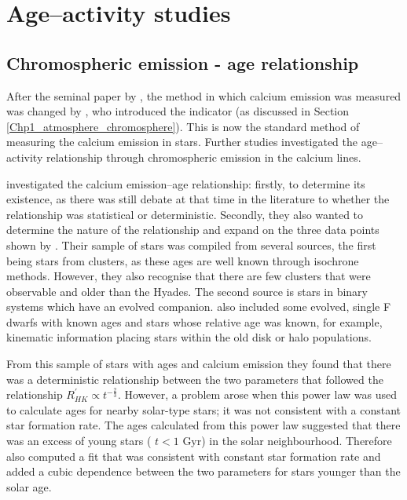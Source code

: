 \section{Age--activity studies}
\label{Chp2_section_activity_age}
\subsection{Chromospheric emission - age relationship}

After the seminal paper by \citet{Skumanich_1972}, the method in which calcium emission was measured was changed by \citet{Noyes_etal_1984}, who introduced the \Rprime indicator (as discussed in Section \ref{Chp1_atmosphere_chromosphere}). This is now the standard method of measuring the calcium emission in stars. Further studies investigated the age--activity relationship through chromospheric emission in the calcium lines.

\citet{Soderblom_etal_1991} investigated the calcium emission--age relationship: firstly, to determine its existence, as there was still debate at that time in the literature to whether the relationship was statistical or deterministic. Secondly, they also wanted to determine the nature of the relationship and expand on the three data points shown by \citet{Skumanich_1972}. Their sample of stars was compiled from several sources, the first being stars from clusters, as these ages are well known through isochrone methods. However, they also recognise that there are few clusters that were observable and older than the Hyades. The second source is stars in binary systems which have an evolved companion. \citet{Soderblom_etal_1991} also included some evolved, single F dwarfs with known ages and stars whose relative age was known, for example, kinematic information placing stars within the old disk or halo populations.

From this sample of stars with ages and calcium emission they found that there was a deterministic relationship between the two parameters that followed the relationship $R^{'}_{HK} \propto t^{-\frac{2}{3}}$. However, a problem arose when this power law was used to calculate ages for nearby solar-type stars; it was not consistent with a constant star formation rate. The ages calculated from this power law suggested that there was an excess of young stars ( $t < 1$ Gyr) in the solar neighbourhood. Therefore \citet{Soderblom_etal_1991} also computed a fit that was consistent with constant star formation rate and added a cubic dependence between the two parameters for stars younger than the solar age.

